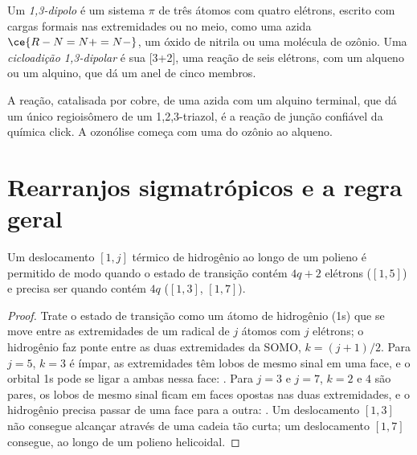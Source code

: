 \begin{definition}\label{def:b3:pericyclic:dipolar}
Um \emph{1,3-dipolo} é um sistema $\pi$ de três átomos com quatro
elétrons, escrito com cargas formais nas extremidades ou no meio, como uma
azida $\ce{R-N=N+=N-}$, um óxido de nitrila ou uma molécula de ozônio. Uma \emph{cicloadição
1,3-dipolar} é sua  [3+2], uma
reação de seis elétrons, com um alqueno ou um alquino, que dá um anel de cinco membros.
\end{definition}

A reação, catalisada por cobre, de uma azida com um alquino terminal, que dá um único
regioisômero de um 1,2,3-triazol, é a reação de junção confiável da química
click. A ozonólise começa com uma  do ozônio ao
alqueno.

\section{Rearranjos sigmatrópicos e a regra geral}

\begin{proposition}\label{prop:b3:pericyclic:sigmatropic-h}
Um deslocamento $[1, j]$ térmico de hidrogênio ao longo de um polieno é permitido de modo  quando o
estado de transição contém $4q + 2$ elétrons ($[1,5]$) e precisa ser  quando contém $4q$
($[1,3]$, $[1,7]$).
\end{proposition}

\begin{proof}
Trate o estado de transição como um átomo de hidrogênio (1s) que se move entre as extremidades de um
radical de $j$ átomos com $j$ elétrons; o hidrogênio faz ponte entre as duas extremidades da
SOMO, $k = (j + 1)/2$. Para $j = 5$, $k = 3$ é ímpar, as extremidades têm lobos de mesmo sinal em uma face,
e o orbital 1s pode se ligar a ambas nessa face: . Para $j = 3$ e $j = 7$,
$k = 2$ e $4$ são pares, os lobos de mesmo sinal ficam em faces opostas nas duas extremidades, e
o hidrogênio precisa passar de uma face para a outra: . Um deslocamento $[1,3]$
não consegue alcançar através de uma cadeia tão curta; um deslocamento $[1,7]$ consegue, ao longo de um polieno helicoidal.
\end{proof}

